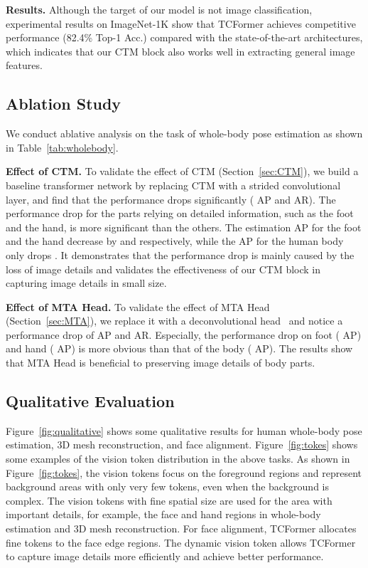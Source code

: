 \documentclass[10pt,twocolumn,letterpaper]{article}
\begin{document}
\textbf{Results.} 
Although the target of our model is not image classification, experimental results on ImageNet-1K show that TCFormer achieves competitive performance (82.4\% Top-1 Acc.) compared with the state-of-the-art architectures, which indicates that our CTM block also works well in extracting general image features. 


\subsection{Ablation Study}
We conduct ablative analysis on the task of whole-body pose estimation as shown in Table~\ref{tab:wholebody}. 

\textbf{Effect of CTM.} 
To validate the effect of CTM (Section~\ref{sec:CTM}), we build a baseline transformer network 
by replacing CTM with a strided convolutional layer,
and find that the performance drops significantly ( AP and  AR). 
The performance drop for the parts relying on detailed information, such as the foot and the hand, is more significant than the others. The estimation AP for the foot and the hand decrease by  and  respectively, while the AP for the human body only drops . It demonstrates that the performance drop is mainly caused by the loss of image details and validates the effectiveness of our CTM block in capturing image details in small size.

\textbf{Effect of MTA Head.} 
To validate the effect of MTA Head (Section~\ref{sec:MTA}), we replace it with a deconvolutional head~\cite{xiao2018simple} and notice a performance drop of  AP and  AR.
Especially, the performance drop on foot ( AP) and hand ( AP) is more obvious than that of the body ( AP). The results show that MTA Head is beneficial to preserving image details of body parts.


\subsection{Qualitative Evaluation}

Figure~\ref{fig:qualitative} shows some qualitative results for human whole-body pose estimation, 3D mesh reconstruction, and face alignment. 
Figure~\ref{fig:tokes} shows some examples of the vision token distribution in the above tasks.
As shown in Figure~\ref{fig:tokes}, the vision tokens focus on the foreground regions and represent background areas with only very few tokens, even when the background is complex.
The vision tokens with fine spatial size are used for the area with important details, for example, the face and hand regions in whole-body estimation and 3D mesh reconstruction. 
For face alignment, TCFormer allocates fine tokens to the face edge regions. 
The dynamic vision token allows TCFormer to capture image details more efficiently and achieve better performance.
\end{document}
